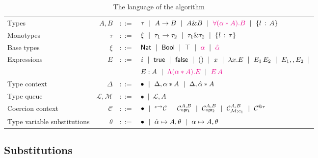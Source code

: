 \documentclass{article}
\begin{document}
\begin{table}[h]
  \begin{tabular}{l r r l}
    Types         & $A, B$   & $::=$ & $\tau~\mid~A \to B~\mid~A \& B~\mid~\textcolor{magenta}{\Tabs{\alpha}{A}{B}}~\mid~\trecord{l}{A}$\vspace{0.1cm}\\
    Monotypes     & $\tau$   & $::=$ & $\xi~\mid~\tau_1\to\tau_2~\mid~\tau_1\&\tau_2~\mid~\trecord{l}{\tau}$ \vspace{0.1cm}\\
    Base types    & $\xi$    & $::=$ & $\nat~\mid~\bool~\mid~\top~\mid~\textcolor{magenta}{\alpha}~\mid~\textcolor{magenta}{\hat{\alpha}}$ \vspace{0.3cm}\\
    Expressions   & $E$      & $::=$ & $i~\mid~\True~\mid~\False~\mid~()~\mid~x~\mid~\abs{x}{E}~\mid~E_1\,E_2~\mid~E_1,,E_2~\mid$\vspace{0.1cm}\\
                  &          &       & $E : A~\mid~\textcolor{magenta}{\tabs{\alpha}{A}{E}}~\mid~\textcolor{magenta}{E\,A}$\vspace{0.3cm}\\
    Type context  & $\Delta$ & $::=$ & $\bullet~\mid~\Delta,\tentry{\alpha}{A}~\mid~\Delta,\tentry{\hat{\alpha}}{A}$\vspace{0.3cm}\\
    Type queue    & $\mathcal{L},\mathcal{M}$ & $::=$ & $\bullet~\mid~\mathcal{L},A$\vspace{0.3cm}\\
    Coercion context & $\mathcal{C}$ & $::=$ & $\bullet~\mid~\arrCC{\mathcal{C}}{c}~\mid~\projlCC{\mathcal{C}}{A}{B}~\mid~\projrCC{\mathcal{C}}{A}{B}~\mid~\mpCC{\mathcal{C}}{\mathcal{M}}{c_1}{A}{B}~\mid~\alllCC{\mathcal{C}}{\tau}$\vspace{0.3cm}\\
    Type variable substitutions & $\theta$ & $::=$ & $\bullet~\mid~\unification{\alpha}{A},\theta~\mid~\substitution{\alpha}{A},\theta$\vspace{0.3cm}
  \end{tabular}
  \caption{The language of the algorithm}
\end{table}

\subsection{Substitutions}
\end{document}
